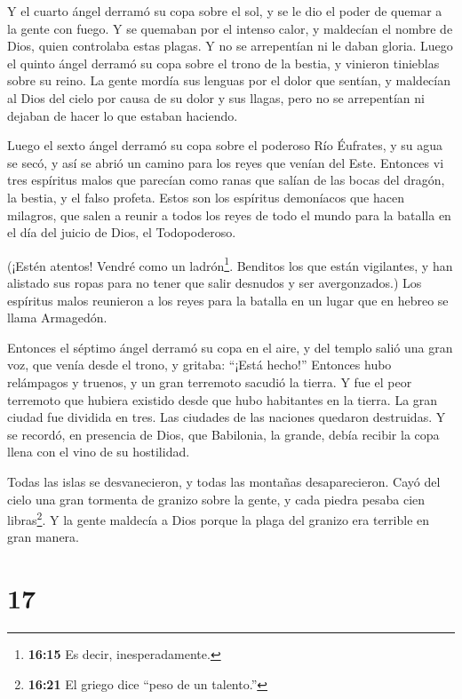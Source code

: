  Y el cuarto ángel derramó su copa sobre el sol, y se le dio
el poder de quemar a la gente con fuego.  Y se quemaban por
el intenso calor, y maldecían el nombre de Dios, quien controlaba estas
plagas. Y no se arrepentían ni le daban gloria.  Luego el
quinto ángel derramó su copa sobre el trono de la bestia, y vinieron
tinieblas sobre su reino. La gente mordía sus lenguas por el dolor que
sentían,  y maldecían al Dios del cielo por causa de su
dolor y sus llagas, pero no se arrepentían ni dejaban de hacer lo que
estaban haciendo.

 Luego el sexto ángel derramó su copa sobre el poderoso Río
Éufrates, y su agua se secó, y así se abrió un camino para los reyes que
venían del Este.  Entonces vi tres espíritus malos que
parecían como ranas que salían de las bocas del dragón, la bestia, y el
falso profeta.  Estos son los espíritus demoníacos que
hacen milagros, que salen a reunir a todos los reyes de todo el mundo
para la batalla en el día del juicio de Dios, el Todopoderoso.

 (¡Estén atentos! Vendré como un ladrón\footnote{\textbf{16:15}
  Es decir, inesperadamente.}. Benditos los que están vigilantes, y han
alistado sus ropas para no tener que salir desnudos y ser avergonzados.)
 Los espíritus malos reunieron a los reyes para la batalla
en un lugar que en hebreo se llama Armagedón.

 Entonces el séptimo ángel derramó su copa en el aire, y
del templo salió una gran voz, que venía desde el trono, y gritaba:
``¡Está hecho!''  Entonces hubo relámpagos y truenos, y un
gran terremoto sacudió la tierra. Y fue el peor terremoto que hubiera
existido desde que hubo habitantes en la tierra.  La gran
ciudad fue dividida en tres. Las ciudades de las naciones quedaron
destruidas. Y se recordó, en presencia de Dios, que Babilonia, la
grande, debía recibir la copa llena con el vino de su hostilidad.

 Todas las islas se desvanecieron, y todas las montañas
desaparecieron.  Cayó del cielo una gran tormenta de
granizo sobre la gente, y cada piedra pesaba cien libras\footnote{\textbf{16:21}
  El griego dice ``peso de un talento.''}. Y la gente maldecía a Dios
porque la plaga del granizo era terrible en gran manera.

\hypertarget{section-16}{%
\section{17}\label{section-16}}

